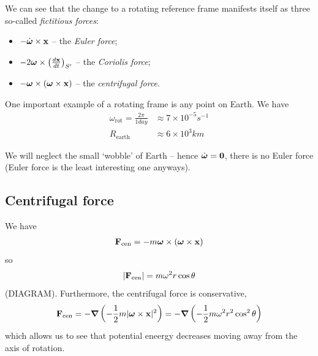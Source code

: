\documentclass{../template/note}
\begin{document}
    We can see that the change to a rotating reference frame manifests itself as three so-called \emph{fictitious forces}:
    \begin{itemize}
        \item \(-\dot{\V \omega} \times \V x\) -- the \emph{Euler force};
        \item \(-2 \V \omega \times \left(\frac{d\V x}{dt}\right)_{S'}\) -- the \emph{Coriolis force};
        \item \(-\V \omega \times (\V \omega \times \V x)\) -- the \emph{centrifugal force}.
    \end{itemize}
    

    One important example of a rotating frame is any point on Earth. We have
    \begin{align*}
        \omega_\text{rot} = \frac{2\pi}{1 \si{day}} &\approx 7 \times 10^{-5} \si{s^{-1}} \\
        R_\text{earth} &\approx 6 \times 10^{3} \si{km}
    \end{align*}

    We will neglect the small `wobble' of Earth -- hence \(\dot{\V \omega} = \V 0\), there is no Euler force (Euler force is the least interesting one anyways).
    
    \subsection{Centrifugal force}
    
    We have
    \begin{align*}
        \V F_\text{cen} = -m \V \omega \times (\V \omega \times \V x)
    \end{align*}
    so
    \begin{align*}
        |\V F_\text{cen}| = m\omega^2 r\cos \theta
    \end{align*}
    (DIAGRAM). Furthermore, the centrifugal force is conservative,
    \begin{align*}
        \V F_\text{cen} = -\grad \left(-\frac 1 2 m|\V \omega \times \V x|^2\right) = -\grad \left(-\frac 1 2 m\omega^2r^2\cos^2\theta\right)
    \end{align*}
    which allows us to see that potential eneergy decreases moving away from the axis of rotation.
\end{document}
